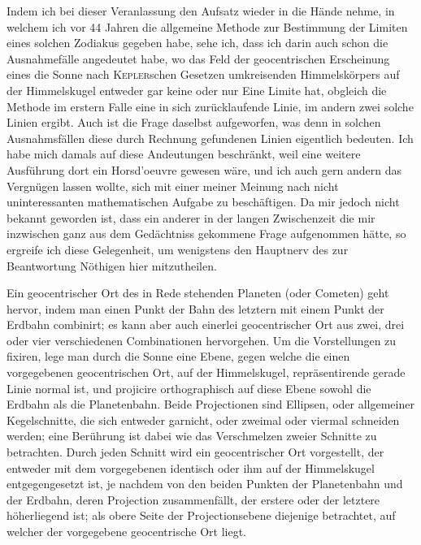 Indem ich bei dieser Veranlassung den Aufsatz\HistoricalNoteEight{Band VI, S. 106.]} wieder in die Hände nehme, in welchem ich vor 44 Jahren die allgemeine Methode zur Bestimmung der Limiten eines solchen Zodiakus gegeben habe, sehe ich, dass ich darin auch schon die Ausnahmefälle angedeutet habe, wo das Feld der geocentrischen Erscheinung eines die Sonne nach \textsc{Kepler}schen Gesetzen umkreisenden Himmelskörpers auf der Himmelskugel entweder gar keine oder nur Eine Limite hat, obgleich die Methode im erstern Falle eine in sich zurücklaufende
Linie, im andern zwei solche Linien ergibt. Auch ist die Frage daselbst
aufgeworfen, was denn in solchen Ausnahmsfällen diese durch Rechnung
gefundenen Linien eigentlich bedeuten. Ich habe mich damals auf diese
Andeutungen beschränkt, weil eine weitere Ausführung dort ein Horsd’oeuvre
gewesen wäre, und ich auch gern andern das Vergnügen lassen wollte, sich mit
einer meiner Meinung nach nicht uninteressanten mathematischen Aufgabe zu
beschäftigen. Da mir jedoch nicht bekannt geworden ist, dass ein anderer in
der langen Zwischenzeit die mir inzwischen ganz aus dem Gedächtniss gekommene
Frage aufgenommen hätte, so ergreife ich diese Gelegenheit, um wenigstens den
Hauptnerv des zur Beantwortung Nöthigen hier mitzutheilen.

Ein geocentrischer Ort des in Rede stehenden Planeten (oder Cometen) geht
hervor, indem man einen Punkt der Bahn des letztern mit einem Punkt der
Erdbahn combinirt; es kann aber auch einerlei geocentrischer Ort aus zwei,
drei oder vier verschiedenen Combinationen hervorgehen. Um die Vorstellungen
zu fixiren, lege man durch die Sonne eine Ebene, gegen welche die einen
vorgegebenen geocentrischen Ort, auf der Himmelskugel, repräsentirende gerade
Linie normal ist, und projicire orthographisch auf diese Ebene sowohl die
Erdbahn als die Planetenbahn. Beide Projectionen sind Ellipsen, oder
allgemeiner Kegelschnitte, die sich entweder garnicht, oder zweimal oder
viermal schneiden werden; eine Berührung ist dabei wie das Verschmelzen
zweier Schnitte zu betrachten. Durch jeden Schnitt wird ein geocentrischer
Ort vorgestellt, der entweder mit dem vorgegebenen identisch oder ihm auf der
Himmelskugel entgegengesetzt ist, je nachdem von den beiden Punkten der
Planetenbahn und der Erdbahn, deren Projection zusammenfällt, der erstere oder
der letztere höherliegend ist; als obere Seite der Projectionsebene diejenige
betrachtet, auf welcher der vorgegebene geocentrische Ort liegt.

